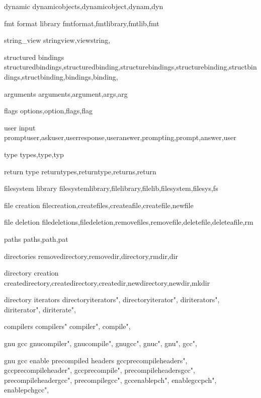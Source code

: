          dynamic 
        dynamicobjects,dynamicobject,dynam,dyn
        
         fmt format library
        fmtformat,fmtlibrary,fmtlib,fmt
          
         string_view
        stringview,viewstring,
        
         structured bindings
        structuredbindings,structuredbinding,structurebindings,structurebinding,structbindings,structbinding,bindings,binding,
        
         arguments 
        arguments,argument,args,arg
        
         flags 
        options,option,flags,flag
        
         user input 
        promptuser,askuser,userresponse,useranswer,prompting,prompt,answer,user  
        
         type 
        types,type,typ  
        
         return type 
        returntypes,returntype,returns,return 
        
         filesystem library
        filesystemlibrary,filelibrary,filelib,filesystem,filesys,fs
         
         file creation 
        filecreation,createfiles,createafile,createfile,newfile 
        
         file deletion 
        filedeletions,filedeletion,removefiles,removefile,deletefile,deleteafile,rm
        
         paths 
        paths,path,pat
        
         directories
        removedirectory,removedir,directory,rmdir,dir

         directory creation
        createdirectory,createdirectory,createdir,newdirectory,newdir,mkdir  
        
         directory iterators 
        directoryiterators",  
        directoryiterator",  
        diriterators",  
        diriterator",  
        diriterate",  
        
         compilers 
        compilers"
        compiler",
        compile",
        
         gnu gcc
        gnucompiler",
        gnucompile",
        gnugcc",
        gnuc",
        gnu",
        gcc",
        
         gnu gcc enable precompiled headers
        gccprecompileheaders",  
        gccprecompileheader",  
        gccprecompile",  
        precompileheadersgcc",  
        precompileheadergcc",  
        precompilegcc",  
        gccenablepch",  
        enablegccpch",  
        enablepchgcc",  
        
